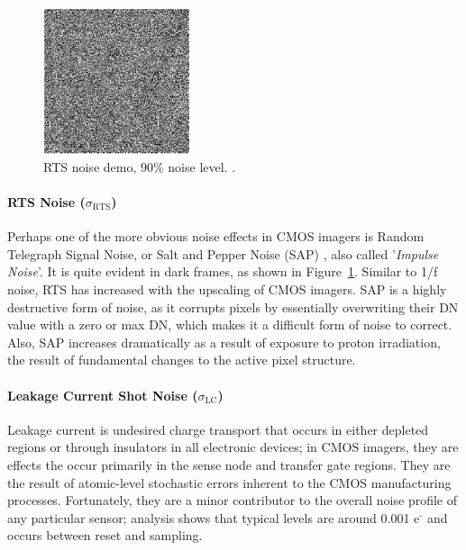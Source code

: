 \documentclass[10pt]{article}
\begin{document}
\begin{figure}[!b]
    \centering
        \includegraphics[height=1.7in]{Salt & Pepper Noise.png}
    \caption{RTS noise demo, 90\% noise level. \cite{fu19}.}
    \label{fig:RTSNoise}
\end{figure}

\paragraph{RTS Noise  (\boldmath $\sigma_{\text{RTS}}$)}
\label{sec:rtsnoise}

Perhaps one of the more obvious noise effects in CMOS imagers is Random Telegraph Signal Noise, or Salt and Pepper Noise (SAP) \cite{website:teldyne24}, also called '\emph{Impulse Noise}'. It is quite evident in dark frames, as shown in Figure~\ref{fig:RTSNoise}. Similar to 1/f noise, RTS has increased with the upscaling of CMOS imagers. SAP is a highly destructive form of noise, as it corrupts pixels by essentially overwriting their DN value with a zero or max DN, which makes it a difficult form of noise to correct. Also, SAP increases dramatically as a result of exposure to proton irradiation, the result of fundamental changes to the active pixel structure. 

\paragraph{Leakage Current Shot Noise (\boldmath $\sigma_{\text{LC}}$)}

Leakage current is undesired charge transport that occurs in either depleted regions or through insulators in all electronic devices; in CMOS imagers, they are effects the occur primarily in the sense node and transfer gate regions. They are the result of atomic-level stochastic errors inherent to the CMOS manufacturing processes. Fortunately, they are a minor contributor to the overall noise profile of any particular sensor; analysis shows that typical levels are around 0.001 $\text{e}^{\text{-}}$ and occurs between reset and sampling.
\end{document}
